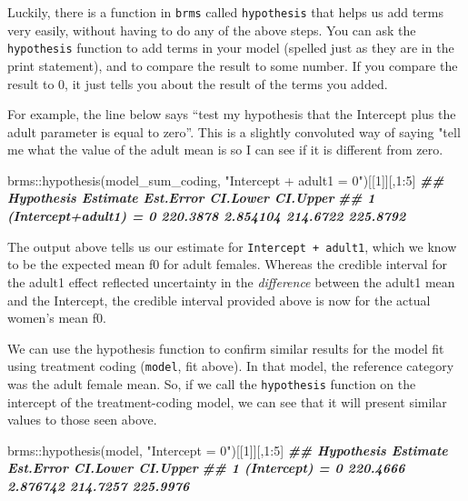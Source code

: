 \documentclass[
]{book}
\newenvironment{Shaded}{\begin{snugshade}}{\end{snugshade}}
\newcommand{\DecValTok}[1]{\textcolor[rgb]{0.00,0.00,0.81}{#1}}
\newcommand{\DocumentationTok}[1]{\textcolor[rgb]{0.56,0.35,0.01}{\textbf{\textit{#1}}}}
\newcommand{\FunctionTok}[1]{\textcolor[rgb]{0.00,0.00,0.00}{#1}}
\newcommand{\NormalTok}[1]{#1}
\newcommand{\SpecialCharTok}[1]{\textcolor[rgb]{0.00,0.00,0.00}{#1}}
\newcommand{\StringTok}[1]{\textcolor[rgb]{0.31,0.60,0.02}{#1}}
\begin{document}
Luckily, there is a function in \texttt{brms} called \texttt{hypothesis} that helps us add terms very easily, without having to do any of the above steps. You can ask the \texttt{hypothesis} function to add terms in your model (spelled just as they are in the print statement), and to compare the result to some number. If you compare the result to 0, it just tells you about the result of the terms you added.

For example, the line below says ``test my hypothesis that the Intercept plus the adult parameter is equal to zero''. This is a slightly convoluted way of saying "tell me what the value of the adult mean is so I can see if it is different from zero.

\begin{Shaded}
\begin{Highlighting}[]
\NormalTok{brms}\SpecialCharTok{::}\FunctionTok{hypothesis}\NormalTok{(model\_sum\_coding, }\StringTok{"Intercept + adult1 = 0"}\NormalTok{)[[}\DecValTok{1}\NormalTok{]][,}\DecValTok{1}\SpecialCharTok{:}\DecValTok{5}\NormalTok{]}
\DocumentationTok{\#\#               Hypothesis Estimate Est.Error CI.Lower CI.Upper}
\DocumentationTok{\#\# 1 (Intercept+adult1) = 0 220.3878  2.854104 214.6722 225.8792}
\end{Highlighting}
\end{Shaded}

The output above tells us our estimate for \texttt{Intercept\ +\ adult1}, which we know to be the expected mean f0 for adult females. Whereas the credible interval for the adult1 effect reflected uncertainty in the \emph{difference} between the adult1 mean and the Intercept, the credible interval provided above is now for the actual women's mean f0.

We can use the hypothesis function to confirm similar results for the model fit using treatment coding (\texttt{model}, fit above). In that model, the reference category was the adult female mean. So, if we call the \texttt{hypothesis} function on the intercept of the treatment-coding model, we can see that it will present similar values to those seen above.

\begin{Shaded}
\begin{Highlighting}[]
\NormalTok{brms}\SpecialCharTok{::}\FunctionTok{hypothesis}\NormalTok{(model, }\StringTok{"Intercept = 0"}\NormalTok{)[[}\DecValTok{1}\NormalTok{]][,}\DecValTok{1}\SpecialCharTok{:}\DecValTok{5}\NormalTok{]}
\DocumentationTok{\#\#        Hypothesis Estimate Est.Error CI.Lower CI.Upper}
\DocumentationTok{\#\# 1 (Intercept) = 0 220.4666  2.876742 214.7257 225.9976}
\end{Highlighting}
\end{Shaded}
\end{document}
